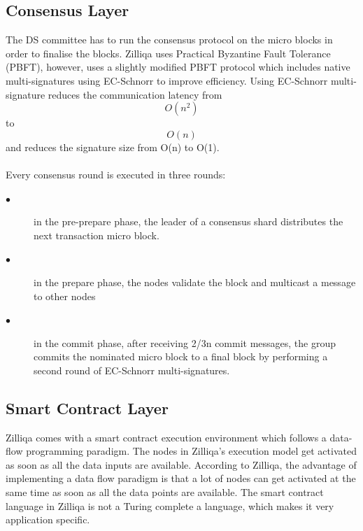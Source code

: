 \documentclass[a4paper,twoside,phd]{BYUPhys}
\begin{document}
\subsection{Consensus Layer}
The DS committee has to run the consensus protocol on the micro blocks in order to finalise the blocks\cite{TheZilliqaTeam2017TheWhitepaper}. Zilliqa uses Practical Byzantine Fault Tolerance (PBFT), however, uses a slightly modified PBFT protocol which includes native multi-signatures using EC-Schnorr to improve efficiency\cite{TheZilliqaTeam2017TheWhitepaper}. Using EC-Schnorr multi-signature reduces the communication latency from \[O(n^2)\] to \[O(n)\] and reduces the signature size from O(n) to O(1)\cite{TheZilliqaTeam2017TheWhitepaper}.
\\
\\
Every consensus round is executed in three rounds\cite{TheZilliqaTeam2017TheWhitepaper}:
\begin{description}
\item[$\bullet$] in the pre-prepare phase, the leader of a consensus shard distributes the next transaction micro block.
\item[$\bullet$] in the prepare phase, the nodes validate the block and multicast a message to other nodes
\item[$\bullet$] in the commit phase, after receiving 2/3n commit messages, the group commits the nominated micro block to a final block by performing a second round of EC-Schnorr multi-signatures.
\end{description}
\subsection{Smart Contract Layer}
Zilliqa comes with a smart contract execution environment which follows a data-flow programming paradigm\cite{TheZilliqaTeam2017TheWhitepaper}. The nodes in Zilliqa's execution model get activated as soon as all the data inputs are available\cite{TheZilliqaTeam2017TheWhitepaper}. According to Zilliqa, the advantage of implementing a data flow paradigm is that a lot of nodes can get activated at the same time as soon as all the data points are available. The smart contract language in Zilliqa is not a Turing complete a language\cite{TheZilliqaTeam2017TheWhitepaper}, which makes it very application specific. 
\end{document}
